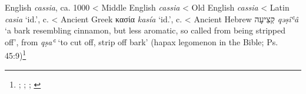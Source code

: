 \begin{etymology}\label{ety:cassia}
English \textit{cassia}, ca. 1000
< Middle English \textit{cassia}
< Old English \textit{cassia}
< Latin \textit{casia} `id.',  c. \AD{}
< Ancient Greek {κασία} \textit{kasía} `id.',  c. \BC{}
< Ancient Hebrew {קְצִיעָה} \textit{qəṣîʿâ} `a bark resembling cinnamon, but less aromatic, so called from being stripped off', from \textit{qṣaʿ} `to cut off, strip off bark' (hapax legomenon in the Bible; Ps. 45:9)\footnote{\textcite[s.v. cassia]{oed}; \textcite{rosol_early_2018}; \textcite[653]{beekes_etymological_2010}; \textcite[589]{klein_comprehensive_1987}}
\end{etymology}